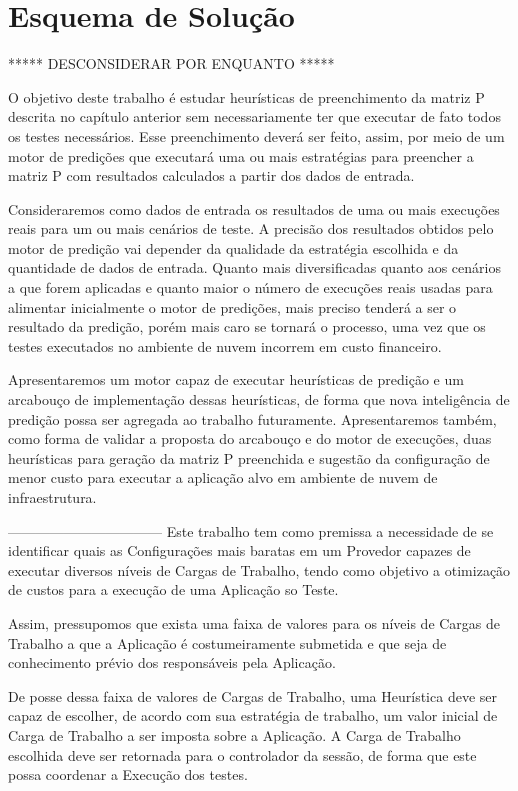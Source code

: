 \chapter[Esquema de Solução]{Esquema de Solução}
***** DESCONSIDERAR POR ENQUANTO *****

O objetivo deste trabalho é estudar heurísticas de preenchimento da matriz P 
descrita no capítulo anterior sem necessariamente ter que executar de fato todos
os testes necessários. Esse preenchimento deverá ser feito, assim, por meio de 
um motor de predições que executará uma ou mais estratégias para preencher a 
matriz P com resultados calculados a partir dos dados de entrada.

Consideraremos como dados de entrada os resultados de uma ou mais execuções 
reais para um ou mais cenários de teste. A precisão dos resultados obtidos pelo 
motor de predição vai depender da qualidade da estratégia escolhida e da 
quantidade de dados de entrada. Quanto mais diversificadas quanto aos cenários a
que forem aplicadas e quanto maior o número de execuções reais usadas para 
alimentar inicialmente o motor de predições, mais preciso tenderá a ser o 
resultado da predição, porém mais caro se tornará o processo, uma vez que os 
testes executados no ambiente de nuvem incorrem em custo financeiro.

Apresentaremos um motor capaz de executar heurísticas de predição e um arcabouço
de implementação dessas heurísticas, de forma que nova inteligência de predição 
possa ser agregada ao trabalho futuramente. Apresentaremos também, como forma de
validar a proposta do arcabouço e do motor de execuções, duas heurísticas para 
geração da matriz P preenchida e sugestão da configuração de menor custo para 
executar a aplicação alvo em ambiente de nuvem de infraestrutura.


---------------------------------
Este trabalho tem como premissa a necessidade de se identificar quais as 
Configurações mais baratas em um Provedor capazes de executar diversos níveis de
Cargas de Trabalho, tendo como objetivo a otimização de custos para a execução de
uma Aplicação so Teste.

Assim, pressupomos que exista uma faixa de valores para os níveis de Cargas de 
Trabalho a que a Aplicação é costumeiramente submetida e que seja de conhecimento
prévio dos responsáveis pela Aplicação. 

De posse dessa faixa de valores de Cargas de Trabalho, uma Heurística deve ser 
capaz de escolher, de acordo com sua estratégia de trabalho, um valor inicial de
Carga de Trabalho a ser imposta sobre a Aplicação. A Carga de Trabalho escolhida
deve ser retornada para o controlador da sessão, de forma que este possa coordenar
a Execução dos testes.
 
